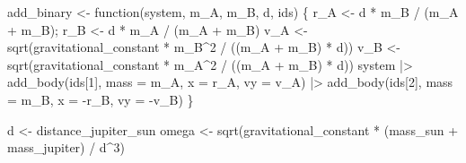 \documentclass[
  10.5pt,
  letterpaper,
]{scrbook}
\newenvironment{Shaded}{\begin{snugshade}}{\end{snugshade}}
\newcommand{\AttributeTok}[1]{\textcolor[rgb]{0.00,0.00,0.00}{#1}}
\newcommand{\ControlFlowTok}[1]{\textcolor[rgb]{0.00,0.00,0.00}{#1}}
\newcommand{\DecValTok}[1]{\textcolor[rgb]{0.00,0.00,0.00}{#1}}
\newcommand{\FunctionTok}[1]{\textcolor[rgb]{0.00,0.00,0.00}{#1}}
\newcommand{\NormalTok}[1]{\textcolor[rgb]{0.00,0.00,0.00}{#1}}
\newcommand{\OtherTok}[1]{\textcolor[rgb]{0.00,0.00,0.00}{#1}}
\newcommand{\SpecialCharTok}[1]{\textcolor[rgb]{0.00,0.00,0.00}{#1}}
\theoremstyle{definition}
\theoremstyle{plain}
\theoremstyle{remark}
\begin{document}
\begin{Shaded}
\begin{Highlighting}[]
\NormalTok{add\_binary }\OtherTok{\textless{}{-}} \ControlFlowTok{function}\NormalTok{(system, m\_A, m\_B, d, ids) \{}
\NormalTok{  r\_A }\OtherTok{\textless{}{-}}\NormalTok{ d }\SpecialCharTok{*}\NormalTok{ m\_B }\SpecialCharTok{/}\NormalTok{ (m\_A }\SpecialCharTok{+}\NormalTok{ m\_B); r\_B }\OtherTok{\textless{}{-}}\NormalTok{ d }\SpecialCharTok{*}\NormalTok{ m\_A }\SpecialCharTok{/}\NormalTok{ (m\_A }\SpecialCharTok{+}\NormalTok{ m\_B)}
\NormalTok{  v\_A }\OtherTok{\textless{}{-}} \FunctionTok{sqrt}\NormalTok{(gravitational\_constant }\SpecialCharTok{*}\NormalTok{ m\_B}\SpecialCharTok{\^{}}\DecValTok{2} \SpecialCharTok{/}\NormalTok{ ((m\_A }\SpecialCharTok{+}\NormalTok{ m\_B) }\SpecialCharTok{*}\NormalTok{ d))}
\NormalTok{  v\_B }\OtherTok{\textless{}{-}} \FunctionTok{sqrt}\NormalTok{(gravitational\_constant }\SpecialCharTok{*}\NormalTok{ m\_A}\SpecialCharTok{\^{}}\DecValTok{2} \SpecialCharTok{/}\NormalTok{ ((m\_A }\SpecialCharTok{+}\NormalTok{ m\_B) }\SpecialCharTok{*}\NormalTok{ d))}
\NormalTok{  system }\SpecialCharTok{|\textgreater{}}
    \FunctionTok{add\_body}\NormalTok{(ids[}\DecValTok{1}\NormalTok{], }\AttributeTok{mass =}\NormalTok{ m\_A, }\AttributeTok{x =}\NormalTok{  r\_A, }\AttributeTok{vy =}\NormalTok{  v\_A) }\SpecialCharTok{|\textgreater{}}
    \FunctionTok{add\_body}\NormalTok{(ids[}\DecValTok{2}\NormalTok{], }\AttributeTok{mass =}\NormalTok{ m\_B, }\AttributeTok{x =} \SpecialCharTok{{-}}\NormalTok{r\_B, }\AttributeTok{vy =} \SpecialCharTok{{-}}\NormalTok{v\_B)}
\NormalTok{\}}

\NormalTok{d     }\OtherTok{\textless{}{-}}\NormalTok{ distance\_jupiter\_sun}
\NormalTok{omega }\OtherTok{\textless{}{-}} \FunctionTok{sqrt}\NormalTok{(gravitational\_constant }\SpecialCharTok{*}\NormalTok{ (mass\_sun }\SpecialCharTok{+}\NormalTok{ mass\_jupiter) }\SpecialCharTok{/}\NormalTok{ d}\SpecialCharTok{\^{}}\DecValTok{3}\NormalTok{)}


\end{Highlighting}
\end{Shaded}
\end{document}
